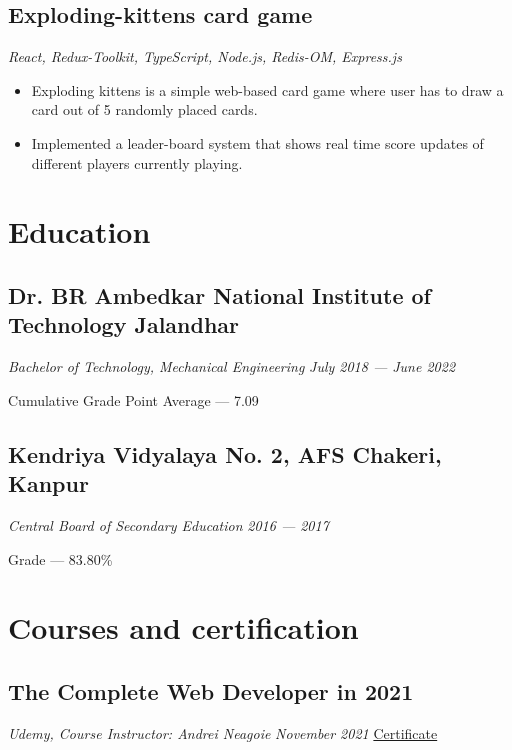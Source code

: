 \documentclass[a4paper]{article}
\begin{document}
\subsection{Exploding-kittens card game}
\textit{React, Redux-Toolkit, TypeScript, Node.js, Redis-OM, Express.js}
\hfill
\href{https://exploding-kittens.netlify.app/}{ \faLink }
\textbar
\href{https://github.com/jatinkumar-me/exploding-kittens}{ \faCode}
\begin{itemize}
    \item Exploding kittens is a simple web-based card game where user has to draw a card out of 5 randomly placed cards. 
    \item Implemented a leader-board system that shows real time score updates of different players currently playing.
\end{itemize}



\section{Education}
\subsection{Dr. BR Ambedkar National Institute of Technology Jalandhar}
\textit{Bachelor of Technology, Mechanical Engineering}
\hfill
\textit{July 2018 --- June 2022}

Cumulative Grade Point Average --- 7.09

\subsection{Kendriya Vidyalaya No. 2, AFS Chakeri, Kanpur}
\textit{Central Board of Secondary Education}
\hfill
\textit{2016 --- 2017}

Grade --- 83.80\%

\section{Courses and certification}
\subsection{The Complete Web Developer in 2021}
\textit{Udemy, Course Instructor: Andrei Neagoie}
\hfill
\textit{November 2021} \textbar \href{https://www.udemy.com/certificate/UC-13ddb4ce-86c8-4396-9cb7-701f5c522fd8/}{  Certificate \faExternalLink}
\end{document}
